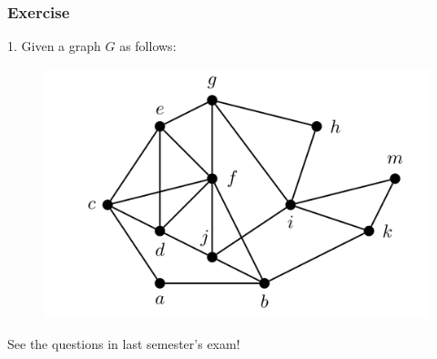 \documentclass{beamer}
\begin{document}
\begin{frame}
    \frametitle{Exercise}
    1. Given a graph $G$ as follows:
    \begin{figure}
        \centering
        \includegraphics[scale=0.36]{graph2.png}
    \end{figure}
    See the questions in last semester's exam!
\end{frame}
\end{document}
